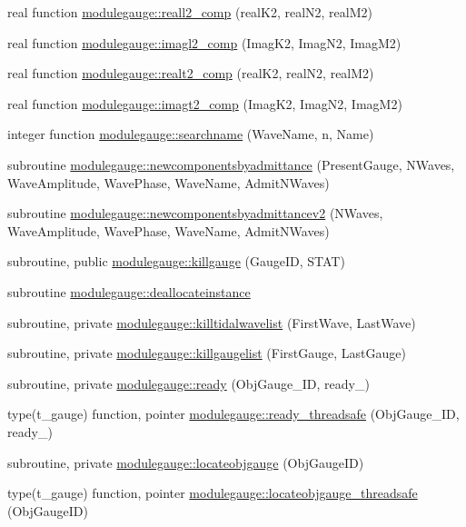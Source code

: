 \begin{DoxyCompactItemize}
real function \mbox{\hyperlink{namespacemodulegauge_ae24e18d5af2b616f42c314149246cef5}{modulegauge\+::reall2\+\_\+comp}} (real\+K2, real\+N2, real\+M2)
\item 
real function \mbox{\hyperlink{namespacemodulegauge_aed10e532f405cfa750b753e960e5a8dc}{modulegauge\+::imagl2\+\_\+comp}} (Imag\+K2, Imag\+N2, Imag\+M2)
\item 
real function \mbox{\hyperlink{namespacemodulegauge_a5708a7eceb753eedf87d41d40a3a619a}{modulegauge\+::realt2\+\_\+comp}} (real\+K2, real\+N2, real\+M2)
\item 
real function \mbox{\hyperlink{namespacemodulegauge_a2dcd9bdfab5c9c98762f6cc509efd8ae}{modulegauge\+::imagt2\+\_\+comp}} (Imag\+K2, Imag\+N2, Imag\+M2)
\item 
integer function \mbox{\hyperlink{namespacemodulegauge_ab1a6acb6664eeba72c5a5d3487c6b4e6}{modulegauge\+::searchname}} (Wave\+Name, n, Name)
\item 
subroutine \mbox{\hyperlink{namespacemodulegauge_a595eb00804040bb46c4684d46b5ed2eb}{modulegauge\+::newcomponentsbyadmittance}} (Present\+Gauge, N\+Waves, Wave\+Amplitude, Wave\+Phase, Wave\+Name, Admit\+N\+Waves)
\item 
subroutine \mbox{\hyperlink{namespacemodulegauge_ac754b86d90578ff131adeb4a3ac03dc5}{modulegauge\+::newcomponentsbyadmittancev2}} (N\+Waves, Wave\+Amplitude, Wave\+Phase, Wave\+Name, Admit\+N\+Waves)
\item 
subroutine, public \mbox{\hyperlink{namespacemodulegauge_a545694594f895a232c1f0b4fc8256bb9}{modulegauge\+::killgauge}} (Gauge\+ID, S\+T\+AT)
\item 
subroutine \mbox{\hyperlink{namespacemodulegauge_a9e3c4492d77966e5e963fad0f376379f}{modulegauge\+::deallocateinstance}}
\item 
subroutine, private \mbox{\hyperlink{namespacemodulegauge_acb5358a89d47698a9abd5cea060b0cc8}{modulegauge\+::killtidalwavelist}} (First\+Wave, Last\+Wave)
\item 
subroutine, private \mbox{\hyperlink{namespacemodulegauge_a773a918cd865d16ad9720682f4f76009}{modulegauge\+::killgaugelist}} (First\+Gauge, Last\+Gauge)
\item 
subroutine, private \mbox{\hyperlink{namespacemodulegauge_a8ece20a220d6beae6919846687d6fe8f}{modulegauge\+::ready}} (Obj\+Gauge\+\_\+\+ID, ready\+\_\+)
\item 
type(t\+\_\+gauge) function, pointer \mbox{\hyperlink{namespacemodulegauge_a758cb1de5348d750b81f0adbb711363f}{modulegauge\+::ready\+\_\+threadsafe}} (Obj\+Gauge\+\_\+\+ID, ready\+\_\+)
\item 
subroutine, private \mbox{\hyperlink{namespacemodulegauge_ad450a5738058992462096cd7d19b5a94}{modulegauge\+::locateobjgauge}} (Obj\+Gauge\+ID)
\item 
type(t\+\_\+gauge) function, pointer \mbox{\hyperlink{namespacemodulegauge_a40155a54ed9673433a35e0eb72673928}{modulegauge\+::locateobjgauge\+\_\+threadsafe}} (Obj\+Gauge\+ID)
\end{DoxyCompactItemize}
